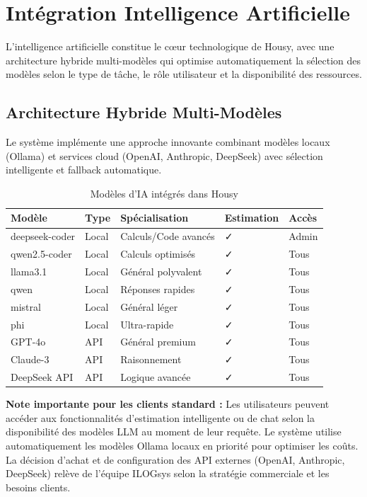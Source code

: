 \section{Intégration Intelligence Artificielle}

L'intelligence artificielle constitue le cœur technologique de Housy, avec une architecture hybride multi-modèles qui optimise automatiquement la sélection des modèles selon le type de tâche, le rôle utilisateur et la disponibilité des ressources.

\subsection{Architecture Hybride Multi-Modèles}

Le système implémente une approche innovante combinant modèles locaux (Ollama) et services cloud (OpenAI, Anthropic, DeepSeek) avec sélection intelligente et fallback automatique.

\begin{table}[H]
\centering
\caption{Modèles d'IA intégrés dans Housy}
\label{tab:modeles_ia}
\begin{tabular}{|p{2.5cm}|p{1.5cm}|p{3cm}|p{1.5cm}|p{1.5cm}|}
\hline
\textbf{Modèle} & \textbf{Type} & \textbf{Spécialisation} & \textbf{Estimation} & \textbf{Accès} \\
\hline
deepseek-coder & Local & Calculs/Code avancés & ✓ & Admin \\
\hline
qwen2.5-coder & Local & Calculs optimisés & ✓ & Tous \\
\hline
llama3.1 & Local & Général polyvalent & ✓ & Tous \\
\hline
qwen & Local & Réponses rapides & ✓ & Tous \\
\hline
mistral & Local & Général léger & ✓ & Tous \\
\hline
phi & Local & Ultra-rapide & ✓ & Tous \\
\hline
GPT-4o & API & Général premium & ✓ & Tous \\
\hline
Claude-3 & API & Raisonnement & ✓ & Tous \\
\hline
DeepSeek API & API & Logique avancée & ✓ & Tous \\
\hline
\end{tabular}
\end{table}

\textbf{Note importante pour les clients standard :} Les utilisateurs peuvent accéder aux fonctionnalités d'estimation intelligente ou de chat selon la disponibilité des modèles LLM au moment de leur requête. Le système utilise automatiquement les modèles Ollama locaux en priorité pour optimiser les coûts. La décision d'achat et de configuration des API externes (OpenAI, Anthropic, DeepSeek) relève de l'équipe ILOGsys selon la stratégie commerciale et les besoins clients.

